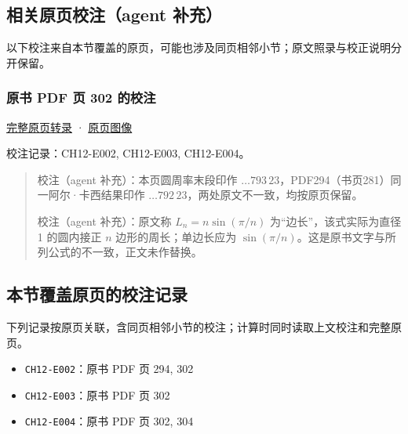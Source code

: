\documentclass[
  10pt,
  fontset=fandol]{ctexart}
\providecommand{\tightlist}{%
  \setlength{\itemsep}{0pt}\setlength{\parskip}{0pt}}
\begin{document}
\subsection{相关原页校注（agent 补充）}\label{ux76f8ux5173ux539fux9875ux6821ux6ce8agent-ux8865ux5145}

以下校注来自本节覆盖的原页，可能也涉及同页相邻小节；原文照录与校正说明分开保留。

\subsubsection{原书 PDF 页 302 的校注}\label{ux539fux4e66-pdf-ux9875-302-ux7684ux6821ux6ce8}

\href{../pages/pdf-302.md}{完整原页转录} · \href{../../source-images/pdf-302.jpeg}{原页图像}

校注记录：CH12-E002, CH12-E003, CH12-E004。

\begin{quote}
校注（agent 补充）：本页圆周率末段印作 \(\ldots793\,23\)，PDF294（书页281）同一阿尔·卡西结果印作 \(\ldots792\,23\)，两处原文不一致，均按原页保留。

校注（agent 补充）：原文称 \(L_n=n\sin(\pi/n)\) 为``边长''，该式实际为直径 1 的圆内接正 \(n\) 边形的周长；单边长应为 \(\sin(\pi/n)\)。这是原书文字与所列公式的不一致，正文未作替换。
\end{quote}

\subsection{本节覆盖原页的校注记录}\label{ux672cux8282ux8986ux76d6ux539fux9875ux7684ux6821ux6ce8ux8bb0ux5f55}

下列记录按原页关联，含同页相邻小节的校注；计算时同时读取上文校注和完整原页。

\begin{itemize}
\tightlist
\item
  \texttt{CH12-E002}：原书 PDF 页 294, 302
\item
  \texttt{CH12-E003}：原书 PDF 页 302
\item
  \texttt{CH12-E004}：原书 PDF 页 302, 304
\end{itemize}
\end{document}
